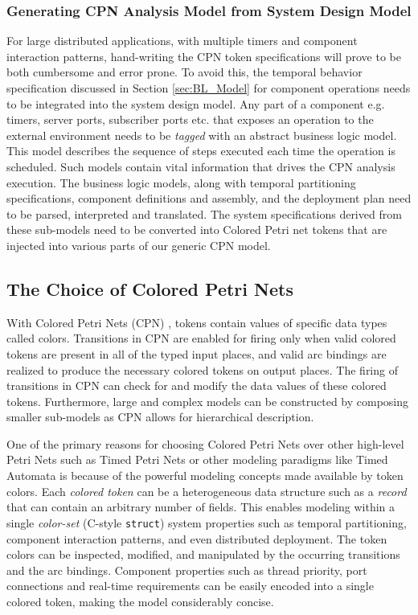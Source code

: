 \subsubsection{Generating CPN Analysis Model from System Design Model}

For large distributed applications, with multiple timers and component interaction patterns, hand-writing the CPN token specifications will prove to be both cumbersome and error prone. To avoid this, the temporal behavior specification discussed in Section \ref{sec:BL_Model} for component operations needs to be integrated into the system design model. Any part of a component e.g. timers, server ports, subscriber ports etc. that exposes an operation to the external environment needs to be \emph{tagged} with an abstract business logic model. This model describes the sequence of steps executed each time the operation is scheduled. Such models contain vital information that drives the CPN analysis execution. The business logic models, along with temporal partitioning specifications, component definitions and assembly, and the deployment plan need to be parsed, interpreted and translated. The system specifications derived from these sub-models need to be converted into Colored Petri net tokens that are injected into various parts of our generic CPN model. 

\subsection{The Choice of Colored Petri Nets}

With Colored Petri Nets (CPN) \cite{CPN}, tokens contain values of specific data types called colors. Transitions in CPN are enabled for firing only when valid colored tokens are present in all of the typed input places, and valid arc bindings are realized to produce the necessary colored tokens on output places. The firing of transitions in CPN can check for and modify the data values of these colored tokens. Furthermore, large and complex models can be constructed by composing smaller sub-models as CPN allows for hierarchical description.

One of the primary reasons for choosing Colored Petri Nets over other high-level Petri Nets such as Timed Petri Nets or other modeling paradigms like Timed Automata is because of the powerful modeling concepts made available by token colors. Each \emph{colored token} can be a heterogeneous data structure such as a \emph{record} that can contain an arbitrary number of fields. This enables modeling within a single \emph{color-set} (C-style \texttt{struct}) system properties such as temporal partitioning, component interaction patterns, and even distributed deployment. The token colors can be inspected, modified, and manipulated by the occurring transitions and the arc bindings. Component properties such as thread priority, port connections and real-time requirements can be easily encoded into a single colored token, making the model considerably concise. 

